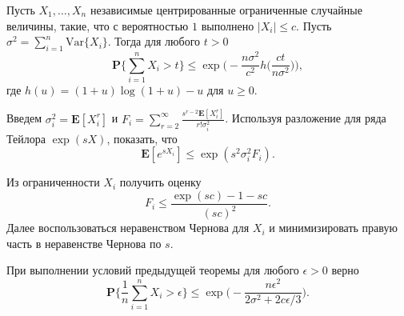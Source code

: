 \begin{problem}
Пусть $X_1,\dots, X_n$ независимые центрированные ограниченные случайные величины, такие, что с вероятностью $1$ выполнено $|X_i|\leq c$.
Пусть $\sigma^2 = \sum_{i=1}^n\text{Var}\{X_i\}$.
 Тогда для любого $t>0$ 
\begin{equation*}
\mathbf{P}\bigg\{\sum_{i=1}^n X_i>t\biggr\}\leq \exp\bigg(-\frac{n\sigma^2}{c^2}h\bigg(\frac{ct}{n\sigma^2}\biggr)\biggr),
\end{equation*}
где $h(u) = (1+u)\log(1+u)-u$ для $u\geq 0$.
\end{problem}
\begin{remark}
Введем $\sigma_i^2 = \mathbf{E}[X_i^r]$ и $F_i = \sum_{r=2}^{\infty}\frac{s^{r-2}\mathbf{E}[X_i^r]}{r!\sigma_i^2}$.
Используя разложение для ряда Тейлора $\exp(sX)$, показать, что 
\begin{equation*}
\mathbf{E}[e^{sX_i}]\leq \exp(s^2\sigma^2_iF_i).
\end{equation*}

Из ограниченности  $X_i$ получить оценку
\begin{equation*}
F_i\leq \frac{\exp(sc)-1-sc}{(sc)^2}.
\end{equation*} 
Далее воспользоваться неравенством Чернова для $X_i$ и минимизировать правую часть в неравенстве Чернова по $s$.
\end{remark}

\begin{problem}
При выполнении условий предыдущей теоремы для любого  $\epsilon>0$ верно 
\begin{equation*}
\mathbf{P}\bigg\{\frac{1}{n}\sum_{i=1}^n X_i>\epsilon\biggr\}\leq \exp\bigg(-\frac{n\epsilon^2}{2\sigma^2+2c\epsilon/3}\biggr).
\end{equation*}
\end{problem}

